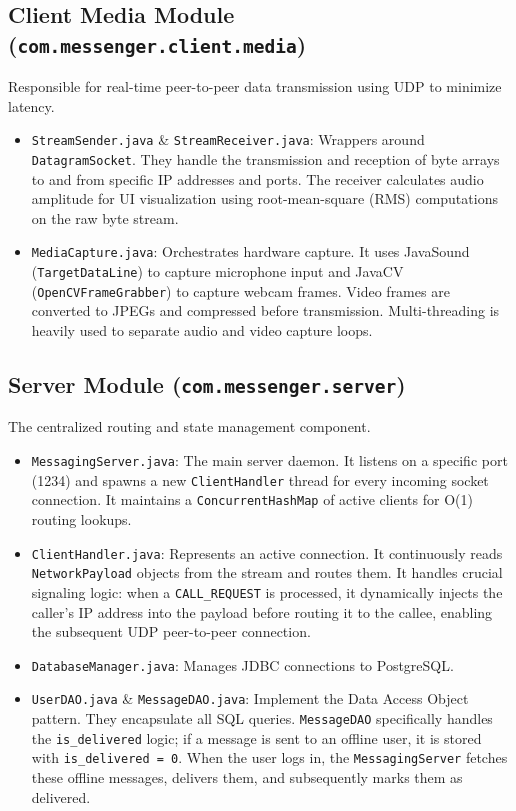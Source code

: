 \documentclass[12pt,a4paper]{article}
\begin{document}
\subsection{Client Media Module (\texttt{com.messenger.client.media})}
Responsible for real-time peer-to-peer data transmission using UDP to minimize latency.
\begin{itemize}
    \item \texttt{StreamSender.java} \& \texttt{StreamReceiver.java}: Wrappers around \texttt{DatagramSocket}. They handle the transmission and reception of byte arrays to and from specific IP addresses and ports. The receiver calculates audio amplitude for UI visualization using root-mean-square (RMS) computations on the raw byte stream.
    \item \texttt{MediaCapture.java}: Orchestrates hardware capture. It uses JavaSound (\texttt{TargetDataLine}) to capture microphone input and JavaCV (\texttt{OpenCVFrameGrabber}) to capture webcam frames. Video frames are converted to JPEGs and compressed before transmission. Multi-threading is heavily used to separate audio and video capture loops.
\end{itemize}

\subsection{Server Module (\texttt{com.messenger.server})}
The centralized routing and state management component.
\begin{itemize}
    \item \texttt{MessagingServer.java}: The main server daemon. It listens on a specific port (1234) and spawns a new \texttt{ClientHandler} thread for every incoming socket connection. It maintains a \texttt{ConcurrentHashMap} of active clients for O(1) routing lookups.
    \item \texttt{ClientHandler.java}: Represents an active connection. It continuously reads \texttt{NetworkPayload} objects from the stream and routes them. It handles crucial signaling logic: when a \texttt{CALL\_REQUEST} is processed, it dynamically injects the caller's IP address into the payload before routing it to the callee, enabling the subsequent UDP peer-to-peer connection.
    \item \texttt{DatabaseManager.java}: Manages JDBC connections to PostgreSQL.
    \item \texttt{UserDAO.java} \& \texttt{MessageDAO.java}: Implement the Data Access Object pattern. They encapsulate all SQL queries. \texttt{MessageDAO} specifically handles the \texttt{is\_delivered} logic; if a message is sent to an offline user, it is stored with \texttt{is\_delivered = 0}. When the user logs in, the \texttt{MessagingServer} fetches these offline messages, delivers them, and subsequently marks them as delivered.
\end{itemize}
\end{document}
